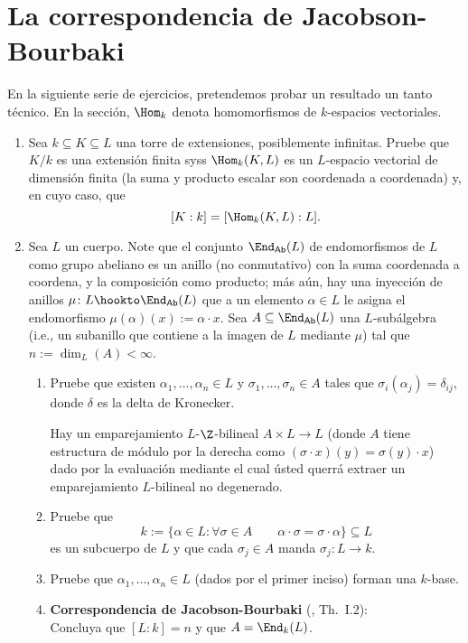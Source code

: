 \documentclass[11pt, reqno]{amsart}
\begin{document}
\section{La correspondencia de Jacobson-Bourbaki}
En la siguiente serie de ejercicios, pretendemos probar un resultado un tanto técnico.
En la sección, $\Hom_k$ denota homomorfismos de $k$-espacios vectoriales.
\begin{enumerate}[resume]
	\item Sea $k \subseteq K \subseteq L$ una torre de extensiones, posiblemente infinitas.
		Pruebe que $K / k$ es una extensión finita syss $\Hom_k(K, L)$ es un $L$-espacio vectorial de dimensión finita (la
		suma y producto escalar son coordenada a coordenada) y, en cuyo caso, que
		\[
			[ K : k ] = [ \Hom_k(K, L) : L ].
		\]

	\item\lookst
		Sea $L$ un cuerpo.
		Note que el conjunto $\End_{\mathsf{Ab}}(L)$ de endomorfismos de $L$ como grupo abeliano es un anillo (no
		conmutativo) con la suma coordenada a coordena, y la composición como producto;
		más aún, hay una inyección de anillos $\mu\colon L \hookto \End_{\mathsf{Ab}}(L)$ que a un elemento $\alpha \in
		L$ le asigna el endomorfismo $\mu(\alpha)(x) := \alpha\cdot x$.
		Sea $A \subseteq \End_{\mathsf{Ab}}(L)$ una $L$-subálgebra (i.e., un subanillo que contiene a la imagen de
		$L$ mediante $\mu$) tal que $n := \dim_L(A) < \infty$.
		\begin{enumerate}
			\item Pruebe que existen $\alpha_1, \dots, \alpha_n \in L$ y $\sigma_1, \dots, \sigma_n \in A$ tales que
				$\sigma_i(\alpha_j) = \delta_{ij}$, donde $\delta$ es la delta de Kronecker.

				\begin{hint}
					Hay un emparejamiento $L$-$\Z$-bilineal $A \times L \to L$ (donde $A$ tiene estructura de módulo por
					la derecha como $(\sigma\cdot x)(y) = \sigma(y)\cdot x$) dado por la evaluación mediante el
					cual ústed querrá extraer un emparejamiento $L$-bilineal no degenerado.
				\end{hint}

			\item Pruebe que
				\[
					k := \{ \alpha \in L : \forall \sigma \in A \qquad \alpha\cdot\sigma = \sigma\cdot\alpha \} \subseteq L
				\]
				es un subcuerpo de $L$ y que cada $\sigma_j \in A$ manda $\sigma_j \colon L \to k$.

			\item Pruebe que $\alpha_1, \dots, \alpha_n \in L$ (dados por el primer inciso) forman una $k$-base.

			\item\textbf{Correspondencia de Jacobson-Bourbaki} (\cite{jacobson:galois}, Th.~I.2):\\
				Concluya que $[L : k] = n$ y que $A = \End_k(L)$.
		\end{enumerate}
\end{enumerate}
\end{document}
